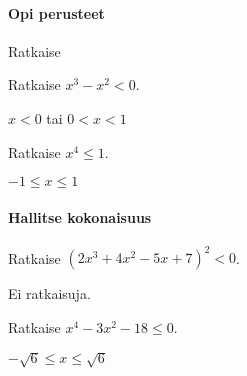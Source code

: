 \begin{tehtavasivu}

\paragraph*{Opi perusteet}

\begin{tehtava}
    Ratkaise
    \begin{alakohdat}
    \end{alakohdat}
    \begin{vastaus}
        \begin{alakohdat}
        \end{alakohdat}
    \end{vastaus}
\end{tehtava}

\begin{tehtava}
    Ratkaise $x^3-x^2<0$.
    \begin{vastaus}
        $x<0$ tai $0<x<1$
    \end{vastaus}
\end{tehtava}

\begin{tehtava}
    Ratkaise $x^4 \le 1$.
    \begin{vastaus}
        $-1 \le x \le 1$
    \end{vastaus}
\end{tehtava}

\paragraph*{Hallitse kokonaisuus}

\begin{tehtava}
    Ratkaise $(2x^3+4x^2-5x+7)^2 < 0$.
    \begin{vastaus}
        Ei ratkaisuja.
    \end{vastaus}
\end{tehtava}

\begin{tehtava}
    Ratkaise $x^4-3x^2-18 \le 0$.
    \begin{vastaus}
        $-\sqrt{6}\le x \le \sqrt{6}$
    \end{vastaus}
\end{tehtava}


\end{tehtavasivu}
